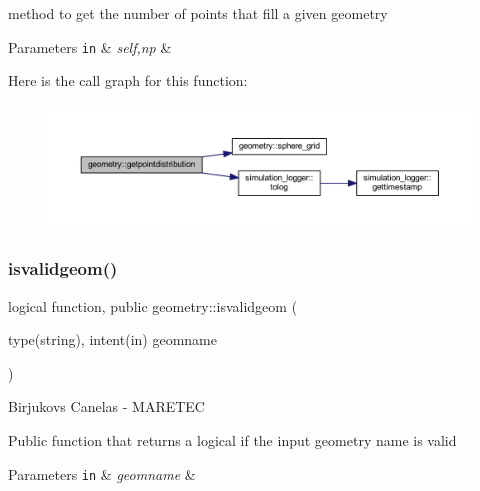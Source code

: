 method to get the number of points that fill a given geometry 
\begin{DoxyParams}[1]{Parameters}
\mbox{\tt in}  & {\em self,np} & \\
\hline
\end{DoxyParams}
Here is the call graph for this function\+:
\nopagebreak
\begin{figure}[H]
\begin{center}
\leavevmode
\includegraphics[width=350pt]{namespacegeometry_a726dae6e63f052138bd3346de439fbc4_cgraph}
\end{center}
\end{figure}
\mbox{\label{namespacegeometry_a56488a00edf7ba4e670ceffd5c36f13f}} 
\subsubsection{\texorpdfstring{isvalidgeom()}{isvalidgeom()}}
{\footnotesize\ttfamily logical function, public geometry\+::isvalidgeom (\begin{DoxyParamCaption}\item[{type(string), intent(in)}]{geomname }\end{DoxyParamCaption})}



Birjukovs Canelas -\/ M\+A\+R\+E\+T\+EC 

Public function that returns a logical if the input geometry name is valid 
\begin{DoxyParams}[1]{Parameters}
\mbox{\tt in}  & {\em geomname} & \\
\hline
\end{DoxyParams}
\mbox{\label{namespacegeometry_ae1ab88f5bfa764765180e1ba417e4bdf}} 
